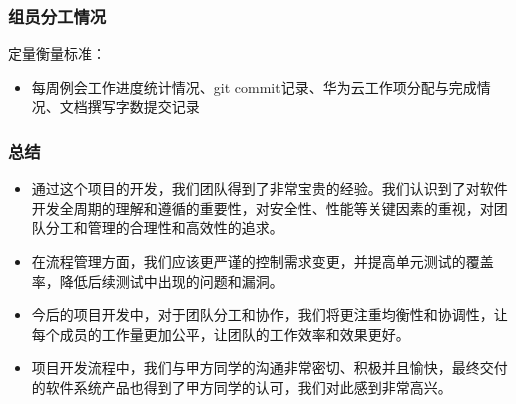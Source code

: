 \begin{frame}
    \frametitle{组员分工情况}
    \begin{table}[]
        \centering
        \caption{工作量表}
        \label{tab:tech-strategy}
    \end{table}
    定量衡量标准：
    \begin{itemize}
        \item 每周例会工作进度统计情况、git commit记录、华为云工作项分配与完成情况、文档撰写字数提交记录
    \end{itemize}
\end{frame}

\begin{frame}
    \frametitle{总结}
    \begin{itemize}
        \item 通过这个项目的开发，我们团队得到了非常宝贵的经验。我们认识到了对软件开发全周期的理解和遵循的重要性，对安全性、性能等关键因素的重视，对团队分工和管理的合理性和高效性的追求。
        \item 在流程管理方面，我们应该更严谨的控制需求变更，并提高单元测试的覆盖率，降低后续测试中出现的问题和漏洞。
        \item 今后的项目开发中，对于团队分工和协作，我们将更注重均衡性和协调性，让每个成员的工作量更加公平，让团队的工作效率和效果更好。
        \item 项目开发流程中，我们与甲方同学的沟通非常密切、积极并且愉快，最终交付的软件系统产品也得到了甲方同学的认可，我们对此感到非常高兴。
    \end{itemize}
\end{frame}
